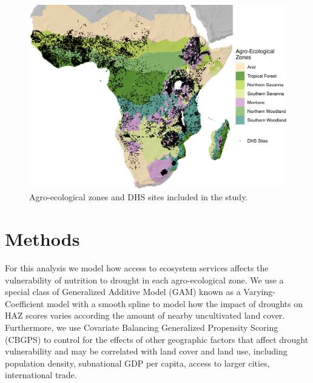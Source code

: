 \documentclass{article}
\begin{document}
\begin{figure}[h]
	\centering
	\includegraphics[width=0.8\linewidth]{AEZ_Sites.png}
	\caption{Agro-ecological zones and DHS sites included in the study.}
	\label{fig:AEZmap}
\end{figure}

\section{Methods}
For this analysis we model how access to ecosystem services affects the vulnerability of nutrition to drought in each agro-ecological zone.  We use a special class of Generalized Additive Model (GAM) known as a Varying-Coefficient model \cite{Wood2017} with a smooth spline to model how the impact of droughts on HAZ scores varies according the amount of nearby uncultivated land cover.  Furthermore, we use Covariate Balancing Generalized Propensity Scoring (CBGPS) \cite{imai2014covariate} to control for the effects of other geographic factors that affect drought vulnerability and may be correlated with land cover and land use, including population density, subnational GDP per capita, access to larger cities, international trade.
\end{document}
